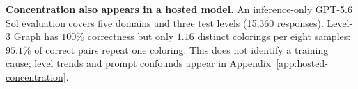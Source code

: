 \noindent\textbf{Concentration also appears in a hosted model.}
\label{sec:hosted-concentration}
An inference-only GPT-5.6 Sol evaluation covers five domains and three test
levels (15,360 responses). Level-3 Graph has $100\%$ correctness but only
$1.16$ distinct colorings per eight samples: $95.1\%$ of correct pairs repeat
one coloring. This does not identify a training cause; level trends and prompt
confounds appear in Appendix~\ref{app:hosted-concentration}.
